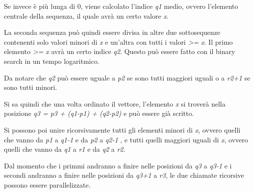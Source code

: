 Se invece è più lunga di 0, viene calcolato l'indice \emph{q1} medio,
ovvero l'elemento centrale della sequenza, il quale avrà un certo valore
\emph{x}.

La seconda sequenza può quindi essere divisa in altre due sottosequenze
contenenti solo valori minori di \emph{x} e un'altra con tutti i valori
\emph{\textgreater{}= x}. Il primo elemento \emph{\textgreater{}= x}
avrà un certo indice \emph{q2}. Questo può essere fatto con il binary
search in un tempo logaritmico.

Da notare che \emph{q2} può essere uguale a \emph{p2} se sono tutti
maggiori uguali o a \emph{r2+1} se sono tutti minori.

Si sa quindi che una volta ordinato il vettore, l'elemento \emph{x} si
troverà nella posizione \emph{q3 = p3 + (q1-p1) + (q2-p2)} e può essere
già scritto.

Si possono poi unire ricorsivamente tutti gli elementi minori di
\emph{x}, ovvero quelli che vanno da \emph{p1} a \emph{q1-1} e da
\emph{p2} a \emph{q2-1} , e tutti quelli maggiori uguali di \emph{x},
ovvero quelli che vanno da \emph{q1} a \emph{r1} e da \emph{q2} a
\emph{r2}.

Dal momento che i primmi andranno a finire nelle posizioni da \emph{q3}
a \emph{q3-1} e i secondi andranno a finire nelle posizioni da
\emph{q3+1} a \emph{r3}, le due chiamate ricorsive possono essere
parallelizzate.
